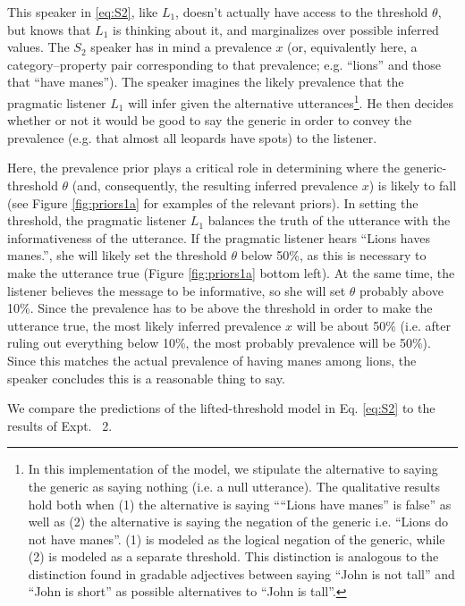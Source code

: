 \documentclass[10pt,letterpaper]{article}
\begin{document}
This speaker in \eqref{eq:S2}, like $L_{1}$, doesn't actually have access to the threshold $\theta$, but knows that $L_{1}$ is thinking about it, and marginalizes over possible inferred values. The $S_{2}$ speaker has in mind a prevalence $x$ (or, equivalently here, a category--property pair corresponding to that prevalence; e.g. ``lions'' and those that ``have manes''). The speaker imagines the likely prevalence that the pragmatic listener $L_{1}$ will infer given the alternative utterances\footnote{In this implementation of the model, we stipulate the alternative to saying the generic as saying nothing (i.e. a null utterance). The qualitative results hold both when (1) the alternative is saying ````Lions have manes'' is false'' as well as (2) the alternative is saying the negation of the generic i.e. ``Lions do not have manes''. (1) is modeled as the logical negation of the generic, while (2) is modeled as a separate threshold. This distinction is analogous to the distinction found in gradable adjectives between saying ``John is not tall'' and ``John is short'' as possible alternatives to ``John is tall''.}. He then decides whether or not it would be good to say the generic in order to convey the prevalence (e.g. that almost all leopards have spots) to the listener.

Here, the prevalence prior plays a critical role in determining where the generic-threshold $\theta$ (and, consequently, the resulting inferred prevalence $x$) is likely to fall (see Figure \ref{fig:priors1a} for examples of the relevant priors). In setting the threshold, the pragmatic listener $L_{1}$ balances the truth of the utterance with the informativeness of the utterance. If the pragmatic listener hears ``Lions haves manes.'', she will likely set the threshold $\theta$ below 50\%, as this is necessary to make the utterance true (Figure \ref{fig:priors1a} bottom left). At the same time, the listener believes the message to be informative, so she will set $\theta$ probably above 10\%. Since the prevalence has to be above the threshold in order to make the utterance true, the most likely inferred prevalence $x$ will be about 50\% (i.e. after ruling out everything below 10\%, the most probably prevalence will be 50\%). Since this matches the actual prevalence of having manes among lions, the speaker concludes this is a reasonable thing to say.

We compare the predictions of the lifted-threshold model in Eq. \ref{eq:S2} to the results of Expt. ~2. 
\end{document}
